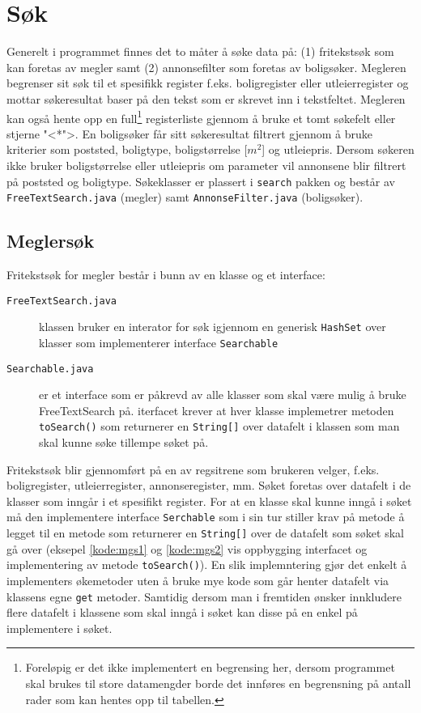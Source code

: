 \section{Søk} \label{sec:sok}
Generelt i programmet finnes det to måter å søke data på: (1) fritekstsøk som kan foretas av megler samt (2) annonsefilter som foretas av boligsøker. Megleren begrenser sit søk til et spesifikk register f.eks. boligregister eller utleierregister og mottar søkeresultat baser på den tekst som er skrevet inn i tekstfeltet. Megleren kan også hente opp en full\footnote{Foreløpig er det ikke implementert en begrensing her, dersom programmet skal brukes til store datamengder borde det innføres en begrensning på antall rader som kan hentes opp til tabellen.} registerliste gjennom å bruke et tomt søkefelt eller stjerne "<*">. 
En boligsøker får sitt søkeresultat filtrert gjennom å bruke kriterier som poststed, boligtype, boligstørrelse [$m^2$] og utleiepris. Dersom søkeren ikke bruker boligstørrelse eller utleiepris om parameter vil annonsene blir filtrert på poststed og boligtype.
Søkeklasser er plassert i \texttt{search} pakken og består av \texttt{FreeTextSearch.java} (megler) samt \texttt{AnnonseFilter.java} (boligsøker).

\subsection{Meglersøk} \label{subsec:sok:megler}
Fritekstsøk for megler består i bunn av en klasse og et interface:
\begin{description}
\item[\texttt{FreeTextSearch.java}] klassen bruker en interator for søk igjennom en generisk \texttt{HashSet} over klasser som implementerer interface \texttt{Searchable}
\item[\texttt{Searchable.java}] er et interface som er påkrevd av alle klasser som skal være mulig å bruke FreeTextSearch på. iterfacet krever at hver klasse implemetrer metoden \texttt{toSearch()} som returnerer en \texttt{String[]} over datafelt i klassen som man skal kunne søke tillempe søket på.
\end{description}

Fritekstsøk blir gjennomført på en av regsitrene som brukeren velger, f.eks. boligregister, utleierregister, annonseregister, mm. Søket foretas over datafelt i de klasser som inngår i et spesifikt register. For at en klasse skal kunne inngå i søket må den implementere interface \texttt{Serchable} som i sin tur stiller krav på metode å legget til en metode som returnerer en \texttt{String[]} over de datafelt som søket skal gå over (eksepel \ref{kode:mgs1} og \ref{kode:mgs2} vis oppbygging interfacet og implementering av metode \texttt{toSearch()}). En slik implemntering gjør det enkelt å implementers økemetoder uten å bruke mye kode som går henter datafelt via klassens egne \texttt{get} metoder. Samtidig dersom man i fremtiden ønsker innkludere flere datafelt i klassene som skal inngå i søket kan disse på en enkel på implementere i søket.

